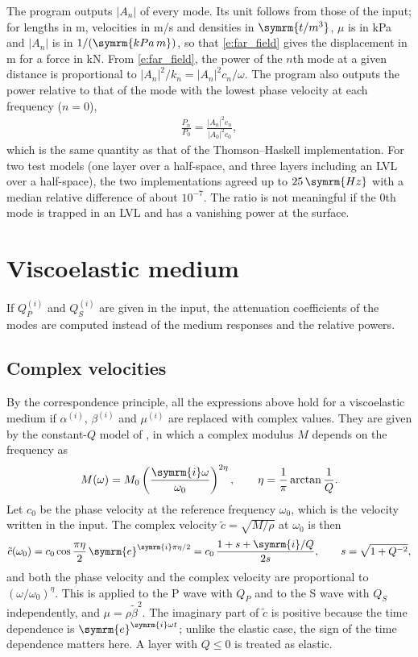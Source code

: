 \documentclass[a4paper, 10pt]{article}
\begin{document}
The program outputs $|A_n|$ of every mode.
Its unit follows from those of the input; for lengths in m, velocities in m/s and densities in $\symrm{t/m^3}$, $\mu$ is in kPa and $|A_n|$ is in $1 / (\symrm{kPa\,m})$, so that \eqref{e:far_field} gives the displacement in m for a force in kN.
From \eqref{e:far_field}, the power of the $n$th mode at a given distance is proportional to $|A_n|^2 / k_n = |A_n|^2 c_n / \omega$.
The program also outputs the power relative to that of the mode with the lowest phase velocity at each frequency ($n = 0$),
\begin{align}
  \frac{P_n}{P_0} = \frac{\left| A_n \right|^2 c_n}{\left| A_0 \right|^2 c_0},
\end{align}
which is the same quantity as that of the Thomson--Haskell implementation.
For two test models (one layer over a half-space, and three layers including an LVL over a half-space), the two implementations agreed up to $25\,\symrm{Hz}$ with a median relative difference of about $10^{-7}$.
The ratio is not meaningful if the $0$th mode is trapped in an LVL and has a vanishing power at the surface.

\section{Viscoelastic medium}

If $Q_P^{(i)}$ and $Q_S^{(i)}$ are given in the input, the attenuation coefficients of the modes are computed instead of the medium responses and the relative powers.

\subsection{Complex velocities}

By the correspondence principle, all the expressions above hold for a viscoelastic medium if $\alpha^{(i)}$, $\beta^{(i)}$ and $\mu^{(i)}$ are replaced with complex values.
They are given by the constant-$Q$ model of \textcite{kjartansson1979}, in which a complex modulus $M$ depends on the frequency as
\begin{align}
  M(\omega) = M_0 \left( \frac{\symrm{i} \omega}{\omega_0} \right)^{2 \eta},
  \qquad
  \eta = \frac{1}{\pi} \arctan \frac{1}{Q}.
\end{align}
Let $c_0$ be the phase velocity at the reference frequency $\omega_0$, which is the velocity written in the input.
The complex velocity $\tilde{c} = \sqrt{M / \rho}$ at $\omega_0$ is then
\begin{align}
  \tilde{c}(\omega_0)
  = c_0 \cos \frac{\pi \eta}{2}\, \symrm{e}^{\symrm{i} \pi \eta / 2}
  = c_0\, \frac{1 + s + \symrm{i} / Q}{2 s},
  \qquad
  s = \sqrt{1 + Q^{-2}},
\end{align}
and both the phase velocity and the complex velocity are proportional to $(\omega / \omega_0)^{\eta}$.
This is applied to the P wave with $Q_P$ and to the S wave with $Q_S$ independently, and $\mu = \rho \tilde{\beta}^2$.
The imaginary part of $\tilde{c}$ is positive because the time dependence is $\symrm{e}^{\symrm{i} \omega t}$; unlike the elastic case, the sign of the time dependence matters here.
A layer with $Q \leq 0$ is treated as elastic.
\end{document}
